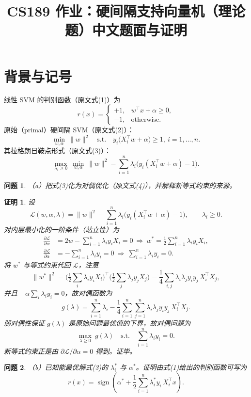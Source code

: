 \documentclass[11pt]{ctexart}
\title{CS189 作业：硬间隔支持向量机（理论题）中文题面与证明}
\author{}
\date{}
\newtheorem{problem}{问题}
\newtheorem*{solution}{证明}
\begin{document}
\maketitle

\section*{背景与记号}
线性 SVM 的判别函数（原文式(1)）为
\[
r(x)=\begin{cases}
+1,& w^\top x+\alpha\ge 0,\\
-1,& \text{otherwise}.
\end{cases}
\]
原始（primal）硬间隔 SVM（原文式(2)）：
\[
\min_{w,\alpha}\ \|w\|^2\quad
\text{s.t.}\quad y_i\big(X_i^\top w+\alpha\big)\ge 1,\ i=1,\dots,n.
\]
其拉格朗日鞍点形式（原文式(3)）：
\[
\max_{\lambda_i\ge 0}\ \min_{w,\alpha}\ \|w\|^2-\sum_{i=1}^n
\lambda_i\big(y_i(X_i^\top w+\alpha)-1\big).
\]

\begin{problem}
（a）把式(3)化为对偶优化（原文式(4)），并解释新等式约束的来源。
\end{problem}

\begin{solution}
设
\[
\mathcal L(w,\alpha,\lambda)=\|w\|^2-\sum_{i=1}^n
\lambda_i\big(y_i(X_i^\top w+\alpha)-1\big),\qquad \lambda_i\ge 0.
\]
对内层最小化的一阶条件（站立性）为
\begin{align*}
\frac{\partial\mathcal L}{\partial w}&=2w-\sum_{i=1}^n\lambda_i y_i X_i=0
\ \Rightarrow\
w^{*}=\frac12\sum_{i=1}^n\lambda_i y_i X_i,\\
\frac{\partial\mathcal L}{\partial \alpha}&=-\sum_{i=1}^n\lambda_i y_i=0
\ \Rightarrow\
\sum_{i=1}^n\lambda_i y_i=0.
\end{align*}
将 $w^{*}$ 与等式约束代回 $\mathcal L$，注意
\[
\|w^{*}\|^2
=\Big(\tfrac12\sum_i\lambda_i y_i X_i\Big)^\top
 \Big(\tfrac12\sum_j\lambda_j y_j X_j\Big)
=\frac14\sum_{i,j}\lambda_i\lambda_jy_iy_j\,X_i^\top X_j,
\]
并且 $-\alpha\sum_i\lambda_i y_i=0$，故对偶函数为
\[
g(\lambda)=\sum_{i=1}^n\lambda_i-\frac14\sum_{i=1}^n\sum_{j=1}^n
\lambda_i\lambda_jy_iy_j\,X_i^\top X_j.
\]
弱对偶性保证 $g(\lambda)$ 是原始问题最优值的下界，故对偶问题为
\[
\max_{\lambda\ge 0}\ g(\lambda)
\quad \text{s.t.}\quad \sum_{i=1}^n\lambda_i y_i=0.
\]
新等式约束正是由 $\partial\mathcal L/\partial\alpha=0$ 得到。证毕。
\end{solution}

\begin{problem}
（b）已知能最优解式(3)的 $\lambda_i^{*}$ 与 $\alpha^{*}$。证明由式(1)给出的判别函数可写为
\[
r(x)=\operatorname{sign}\!\left(\alpha^{*}+\frac12\sum_{i=1}^n \lambda_i^{*} y_i\,X_i^\top x\right).
\]
\end{problem}
\end{document}
